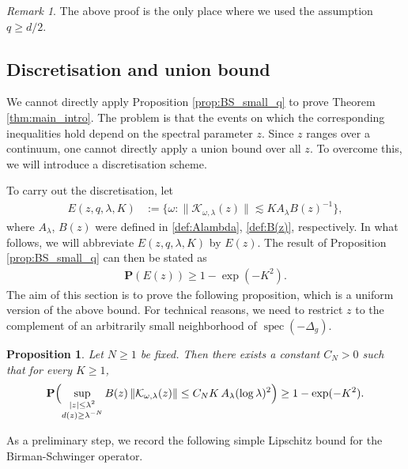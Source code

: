 \documentclass[12pt,reqno]{amsart}
\newtheorem{proposition}[theorem]{Proposition}
\theoremstyle{definition}
\theoremstyle{remark}
\newtheorem{remark}[theorem]{Remark}
\numberwithin{equation}{section}
\newcommand{\1}{\mathbbm{1}}
\DeclareMathOperator{\spec}{spec}
\begin{document}
\begin{remark}
 The above proof is the only place where we used the assumption $q\geq d/2$.   
\end{remark}

\subsection{Discretisation and union bound}
We cannot directly apply Proposition \ref{prop:BS_small_q} to prove Theorem \ref{thm:main_intro}.
The problem is that the events on which the corresponding inequalities hold depend on the spectral parameter \(z\). 
Since \(z\) ranges over a continuum, one cannot directly apply a union bound over all \(z\). To overcome this, we will introduce a discretisation scheme.


To carry out the discretisation, let
\begin{align}
    E(z,q,\lambda,K)&:=\{\omega:\|\mathcal{K}_{\omega,\lambda}(z)\|\lesssim K A_{\lambda}B(z)^{-1}\},\label{def:E(z)}
\end{align}
where $A_{\lambda}$, $B(z)$ were defined in \eqref{def:Alambda}, \eqref{def:B(z)}, respectively.
In what follows, we will abbreviate \(E(z,q,\lambda,K)\) by \(E(z)\).
The result of Proposition \ref{prop:BS_small_q} can then be stated as
\begin{align}\label{eq:P(E(z))}
  \mathbf{P}(E(z))\geq 1-\exp(-K^2).
\end{align}
The aim of this section is to prove the following proposition, which is a uniform version of the above bound. For technical reasons, we need to restrict $z$ to the complement of an arbitrarily small neighborhood of $\spec(-\Delta_g)$.

\begin{proposition}\label{prop:uniform-on-truncated-region}
Let \(N\geq 1\) be fixed. Then there exists a constant \(C_N>0\) such that
for every \(K\geq 1\),
\begin{align}\label{eq:uniform-on-truncated-region}
\mathbf P\Bigl(
\sup_{\substack{|z|\leq \lambda^2\\ d(z)\geq \lambda^{-N}}}
B(z)\,\|\mathcal K_{\omega,\lambda}(z)\|
\leq
C_NK\,A_\lambda (\log\lambda)^2
\Bigr)
\geq
1-\exp(-K^2).
\end{align}
\end{proposition}


As a preliminary step, we record the following simple Lipschitz bound for the Birman-Schwinger operator.
\end{document}
